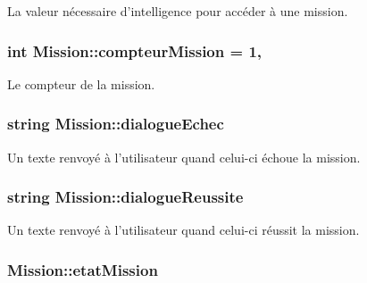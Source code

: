 La valeur nécessaire d'intelligence pour accéder à une mission. 

\hypertarget{class_mission_af6589a43033e50899832cc63939ecb23}{
\subsubsection[{compteur\-Mission}]{\setlength{\rightskip}{0pt plus 5cm}int Mission\-::compteur\-Mission = 1\hspace{0.3cm}{\ttfamily [static]}, {\ttfamily [protected]}}}\label{class_mission_af6589a43033e50899832cc63939ecb23}


Le compteur de la mission. 

\hypertarget{class_mission_aeb543b4e12125834e6b8901820db243b}{
\subsubsection[{dialogue\-Echec}]{\setlength{\rightskip}{0pt plus 5cm}string Mission\-::dialogue\-Echec\hspace{0.3cm}{\ttfamily [protected]}}}\label{class_mission_aeb543b4e12125834e6b8901820db243b}


Un texte renvoyé à l'utilisateur quand celui-\/ci échoue la mission. 

\hypertarget{class_mission_a75d8fc66d0ed01f1f1192e03528a2612}{
\subsubsection[{dialogue\-Reussite}]{\setlength{\rightskip}{0pt plus 5cm}string Mission\-::dialogue\-Reussite\hspace{0.3cm}{\ttfamily [protected]}}}\label{class_mission_a75d8fc66d0ed01f1f1192e03528a2612}


Un texte renvoyé à l'utilisateur quand celui-\/ci réussit la mission. 

\hypertarget{class_mission_a7a3a8c801854fdbc1ddfb73d187e5b2e}{
\subsubsection[{etat\-Mission}]{ Mission\-::etat\-Mission\hspace{0.3cm}{\ttfamily [protected]}}}\label{class_mission_a7a3a8c801854fdbc1ddfb73d187e5b2e}


